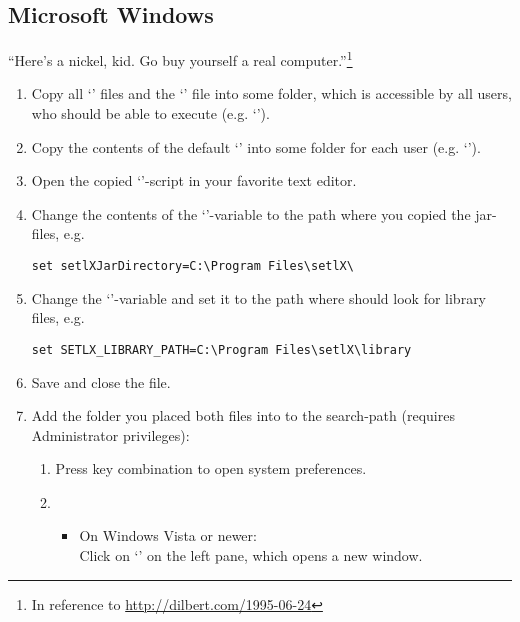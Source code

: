\subsection{Microsoft Windows}

\begin{center}
\large
``Here's a nickel, kid. Go buy yourself a real computer.''\footnote{In reference to \url{http://dilbert.com/1995-06-24}}
\end{center}

\begin{enumerate}
	\item Copy all `' files and the `' file into some folder, which is accessible by all users, who should be able to execute \setlX{} (e.g. `').
	\item Copy the contents of the default `' into some folder for each user (e.g. `').
	\item Open the copied `'-script in your favorite text editor.
	\item Change the contents of the `'-variable to the path where you copied the jar-files, e.g.
\begin{lstlisting}[frame=none,numbers=none]
set setlXJarDirectory=C:\Program Files\setlX\
\end{lstlisting}
	\item Change the `'-variable and set it to the path where \setlX{} should look for library files, e.g.
\begin{lstlisting}[frame=none,numbers=none]
set SETLX_LIBRARY_PATH=C:\Program Files\setlX\library
\end{lstlisting}
	\item Save and close the file.
	\item Add the folder you placed both files into to the search-path (requires Administrator privileges):
	\begin{enumerate}
		\item Press \command{[Win]+[Pause]} key combination to open system preferences.
		\item 
		\begin{itemize}
			\item On Windows Vista or newer:\\Click on `' on the left pane, which opens a new window.

\end{itemize}
\end{enumerate}
\end{enumerate}
